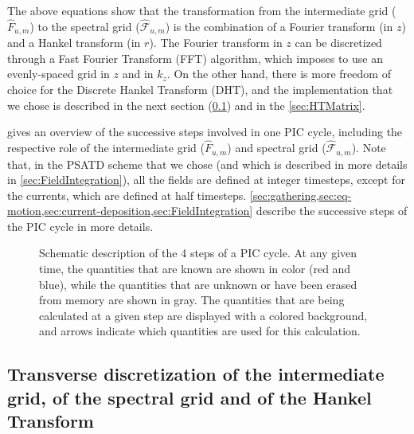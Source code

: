 \documentclass[1p,times,authoryear]{elsarticle}
\newcommand{\spectral}[1]{\hat{\mathcal{#1}}}
\begin{document}
The above equations show that the transformation from the intermediate
grid ($\hat{F}_{u,m}$) to the spectral grid ($\spectral{F}_{u,m}$) is
the combination of a Fourier transform (in $z$) and a Hankel transform
(in $r$). The Fourier transform in $z$ can be discretized through a Fast Fourier
Transform (FFT) algorithm, which imposes to use an evenly-spaced grid
in $z$ and in $k_z$. On the other hand, there is more freedom of
choice for the Discrete Hankel Transform (DHT), and the implementation that
we chose is described in the next section
(\cref{sec:discretization}) and in the \ref{sec:HTMatrix}.

 gives an overview of the successive steps
involved in one PIC cycle, including the
respective role of the intermediate grid ($\hat{F}_{u,m}$) and
spectral grid ($\spectral{F}_{u,m}$). Note that, in the PSATD
scheme that we chose (and which is described in more details in
\cref{sec:FieldIntegration}), all the fields are defined at integer
timesteps, except for the currents, which are defined at half
timesteps.  
\cref{sec:gathering,sec:eq-motion,sec:current-deposition,sec:FieldIntegration} 
describe the successive steps of the PIC cycle in more details.

\begin{figure}

\caption{\label{fig:GlobalScheme}Schematic description of the 4 steps
  of a PIC
  cycle. At any given time, the quantities that
  are known are shown in color (red and blue), 
while the quantities that are unknown or have been erased from memory 
are shown in gray. The quantities that are being calculated at a given step are
  displayed with a colored background, and arrows indicate which
  quantities are used for this calculation.}
\end{figure}


\subsection{Transverse discretization of the intermediate grid, 
of the spectral grid and of the Hankel Transform}
\label{sec:discretization}
\end{document}
